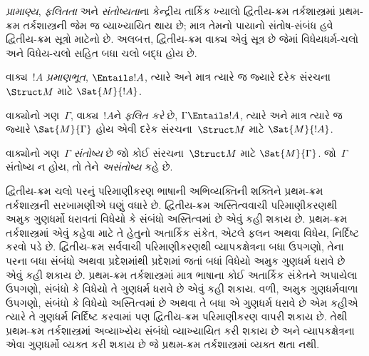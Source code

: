 \begingroup
\makeatletter{}\makeatother

\label{guunit:OLP-0327}


\begin{explain}
\emph{પ્રામાણ્ય}, \emph{ફલિતતા} અને \emph{સંતોષ્યતા}ના કેન્દ્રીય
તાર્કિક ખ્યાલો દ્વિતીય-ક્રમ તર્કશાસ્ત્રમાં પ્રથમ-ક્રમ તર્કશાસ્ત્રની
જેમ જ વ્યાખ્યાયિત થાય છે; માત્ર તેમનો પાયાનો સંતોષ-સંબંધ હવે
દ્વિતીય-ક્રમ સૂત્રો માટેનો છે. અલબત્ત, દ્વિતીય-ક્રમ
વાક્ય એવું સૂત્ર છે જેમાં વિધેયધર્મ-ચલો અને
વિધેય-ચલો સહિત બધા ચલો બદ્ધ હોય છે.
\end{explain}

\begin{defn}[પ્રામાણ્ય]
વાક્ય~$!A$ \emph{પ્રમાણભૂત}, $\Entails !A$, ત્યારે અને માત્ર ત્યારે જ
જ્યારે દરેક સંરચના~$\Struct M$ માટે $\Sat{M}{!A}$.
\end{defn}

\begin{defn}[ફલિતતા]
વાક્યોનો ગણ~$\Gamma$, વાક્ય~$!A$ને \emph{ફલિત કરે} છે,
$\Gamma \Entails !A$, ત્યારે અને માત્ર ત્યારે જ જ્યારે
$\Sat{M}{\Gamma}$ હોય એવી દરેક સંરચના~$\Struct M$ માટે
$\Sat{M}{!A}$.
\end{defn}

\begin{defn}[સંતોષ્યતા]
વાક્યોનો ગણ~$\Gamma$ \emph{સંતોષ્ય} છે જો કોઈ સંરચના~$\Struct M$
માટે $\Sat{M}{\Gamma}$. જો~$\Gamma$ સંતોષ્ય ન હોય, તો તેને
\emph{અસંતોષ્ય} કહે છે.
\end{defn}
\endgroup


\begingroup
\makeatletter{}\makeatother

\label{guunit:OLP-0328}


\begin{explain}
દ્વિતીય-ક્રમ ચલો પરનું પરિમાણીકરણ ભાષાની અભિવ્યક્તિની શક્તિને
પ્રથમ-ક્રમ તર્કશાસ્ત્રની સરખામણીએ ઘણું વધારે છે. દ્વિતીય-ક્રમ
અસ્તિત્વવાચી પરિમાણીકરણથી અમુક ગુણધર્મો ધરાવતાં વિધેયો કે સંબંધો
અસ્તિત્વમાં છે એવું કહી શકાય છે. પ્રથમ-ક્રમ તર્કશાસ્ત્રમાં એવું કહેવા
માટે તે હેતુનો અતાર્કિક સંકેત, એટલે ફલન અથવા વિધેય,
નિર્દિષ્ટ કરવો પડે છે. દ્વિતીય-ક્રમ સર્વવાચી પરિમાણીકરણથી વ્યાપકક્ષેત્રના
બધા ઉપગણો, તેના પરના બધા સંબંધો અથવા પ્રદેશમાંથી પ્રદેશમાં
જતાં બધાં વિધેયો અમુક ગુણધર્મ ધરાવે છે એવું કહી શકાય છે. પ્રથમ-ક્રમ
તર્કશાસ્ત્રમાં માત્ર ભાષાના કોઈ અતાર્કિક સંકેતને અપાયેલા ઉપગણો,
સંબંધો કે વિધેયો તે ગુણધર્મ ધરાવે છે એવું કહી શકાય. વળી,
અમુક ગુણધર્મવાળા ઉપગણો, સંબંધો કે વિધેયો અસ્તિત્વમાં છે અથવા તે બધા
એ ગુણધર્મ ધરાવે છે એમ કહીએ ત્યારે તે ગુણધર્મ નિર્દિષ્ટ કરવામાં પણ
દ્વિતીય-ક્રમ પરિમાણીકરણ વાપરી શકાય છે. તેથી પ્રથમ-ક્રમ તર્કશાસ્ત્રમાં
અવ્યાખ્યેય સંબંધો વ્યાખ્યાયિત કરી શકાય છે અને વ્યાપકક્ષેત્રના એવા
ગુણધર્મો વ્યક્ત કરી શકાય છે જે પ્રથમ-ક્રમ તર્કશાસ્ત્રમાં વ્યક્ત થતા
નથી.
\end{explain}


